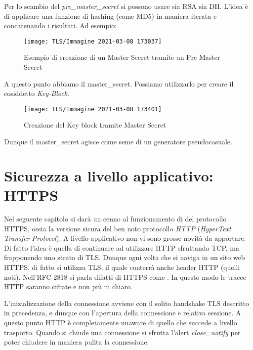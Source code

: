 \documentclass[14pt]{extreport}
\begin{document}
Per lo scambio del \textit{pre\_master\_secret} si possono usare sia RSA sia DH. 
L'idea è di applicare una funzione di hashing (come MD5) in maniera iterata e concatenando i risultati. Ad esempio:




\begin{figure}[H]
    \centering
    \texttt{[image: TLS/Immagine 2021-03-08 173037]}
    \caption{Esempio di creazione di un Master Secret tramite un Pre Master Secret}
\end{figure}


A questo punto abbiamo il master\_secret. Possiamo utilizzarlo per creare il cosiddetto \textit{Key-Block}.






\begin{figure}[H]
    \centering
    \texttt{[image: TLS/Immagine 2021-03-08 173401]}
    \caption{Creazione del Key block tramite Master Secret}
\end{figure}


Dunque il master\_secret agisce come seme di un generatore pseudocasuale.



\chapter{Sicurezza a livello applicativo: HTTPS}

Nel seguente capitolo si darà un cenno al funzionamento di del protocollo HTTPS, ossia la versione sicura del ben noto protocollo \textit{HTTP} (\textit{HyperText Transfer Protocol}).
A livello applicativo non vi sono grosse novità da apportare. Di fatto l'idea è quella di continuare ad utilizzare HTTP sfruttando TCP, ma frapponendo uno strato di TLS. Dunque ogni volta che si naviga in un sito web HTTPS, di fatto si utilizza TLS, il quale conterrà anche header HTTP (quelli noti). Nell'RFC 2818 si parla difatti di HTTPS come .
In questo modo le tracce HTTP saranno cifrate e non più in chiaro.

L'inizializzazione della connessione avviene con il solito handshake TLS descritto in precedenza, e dunque con l'apertura della connessione e relativa sessione. A questo punto HTTP è completamente unaware di quello che succede a livello trasporto.
Quando si chiude una connessione si sfrutta l'alert \textit{close\_notify} per poter chiudere in maniera pulita la connessione.
\end{document}
